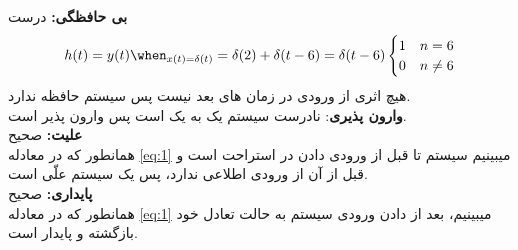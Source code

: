 \begin{qsolve}[]
	\begin{qsolve}[]
		\textbf{بی حافظگی:} درست
		\begin{eqnarray}\label{eq:1}
			h(t)=y(t)\when_{x(t)=\delta(t)}=\delta(2)+\delta(t-6)=\delta(t-6)
			\begin{cases}
				1 & n = 6    \\
				0 & n \neq 6
			\end{cases}
		\end{eqnarray}
		هیچ اثری از ورودی در زمان های بعد نیست پس سیستم حافظه ندارد.\\
		\textbf{وارون پذیری}: نادرست
		سیستم یک به یک است پس وارون پذیر است.\\
		\textbf{علیت:} صحیح\\
		همانطور که در معادله \ref*{eq:1} میبینیم سیستم تا
		قبل از ورودی دادن در استراحت است و قبل از آن از ورودی
		اطلاعی ندارد، پس یک سیستم علّی است.\\
		\textbf{پایداری:} صحیح\\
		همانطور که در معادله \ref*{eq:1} میبینیم، بعد از
		دادن ورودی سیستم به حالت تعادل خود بازگشته و پایدار است.
	\end{qsolve}
\end{qsolve}